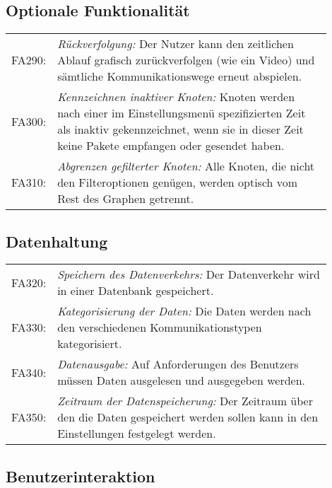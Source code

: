 \subsection{Optionale Funktionalität}
\begin{tabular}{lp{0.9\linewidth}}

FA290: & \textit{Rückverfolgung: }Der Nutzer kann den zeitlichen Ablauf grafisch zurückverfolgen (wie ein Video) und sämtliche Kommunikationswege erneut abspielen. \\

FA300: & \textit{Kennzeichnen inaktiver Knoten: }Knoten werden nach einer im Einstellungsmenü spezifizierten Zeit als inaktiv gekennzeichnet, wenn sie in dieser Zeit keine Pakete empfangen oder gesendet haben. \\

FA310: & \textit{Abgrenzen gefilterter Knoten: }Alle Knoten, die nicht den Filteroptionen genügen, werden optisch vom Rest des Graphen getrennt. \\

\end{tabular}

\subsection{Datenhaltung}

\begin{tabular}{lp{0.9\linewidth}}

FA320: & \textit{Speichern des Datenverkehrs: }Der Datenverkehr wird in einer Datenbank gespeichert. \\

FA330: & \textit{Kategorisierung der Daten: }Die Daten werden nach den verschiedenen Kommunikationstypen kategorisiert. \\

FA340: & \textit{Datenausgabe: }Auf Anforderungen des Benutzers müssen Daten ausgelesen und ausgegeben werden. \\

FA350: & \textit{Zeitraum der Datenspeicherung: }Der Zeitraum über den die Daten gespeichert werden sollen kann in den Einstellungen festgelegt werden. \\

\end{tabular}

\subsection{Benutzerinteraktion}

